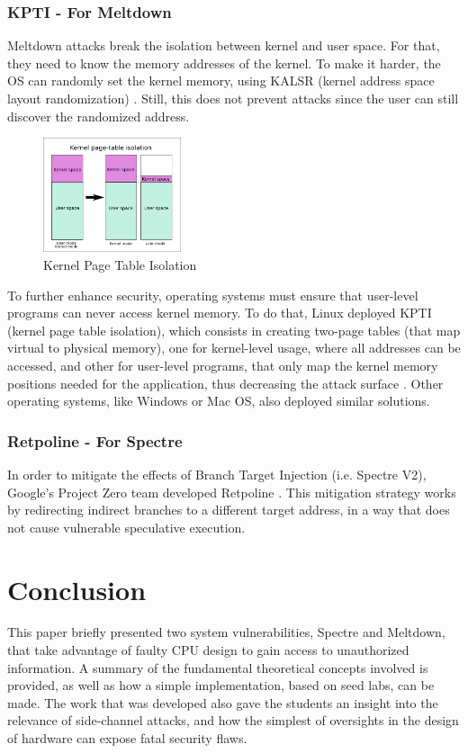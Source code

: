 \documentclass[conference]{IEEEtran}
\begin{document}
\subsubsection{KPTI - For Meltdown}
Meltdown attacks break the isolation between kernel and user space. For that, they need to know the memory addresses of the kernel. To make it harder, the OS can randomly set the kernel memory, using KALSR (kernel address space layout randomization) \cite{meltdownPaper}. Still, this does not prevent attacks since the user can still discover the randomized address.
\begin{figure}[h]
  \centering
  \includegraphics[width=0.36\textwidth]{figures/kpti.png}
  \caption{Kernel Page Table Isolation}
  \label{fig:Kernel Page Table Isolation}
\end{figure}
To further enhance security, operating systems must ensure that user-level programs can never access kernel memory. To do that, Linux deployed KPTI (kernel page table isolation), which consists in creating two-page tables (that map virtual to physical memory), one for kernel-level usage, where all addresses can be accessed, and other for user-level programs, that only map the kernel memory positions needed for the application, thus decreasing the attack surface \cite{databricksMitigations}. Other operating systems, like Windows or Mac OS, also deployed similar solutions.

\subsubsection{Retpoline - For Spectre}
In order to mitigate the effects of Branch Target Injection (i.e. Spectre V2), Google's Project Zero team developed Retpoline \cite{retpolineIntel}. This mitigation strategy works by redirecting indirect branches to a different target address, in a way that does not cause vulnerable speculative execution. 


\section{Conclusion}
This paper briefly presented two system vulnerabilities, Spectre and Meltdown, that take advantage of faulty CPU design to gain access to unauthorized information. A summary of the fundamental theoretical concepts involved is provided, as well as how a simple implementation, based on seed labs, can be made. The work that was developed also gave the students an insight into the relevance of side-channel attacks, and how the simplest of oversights in the design of hardware can expose fatal security flaws.
\end{document}
